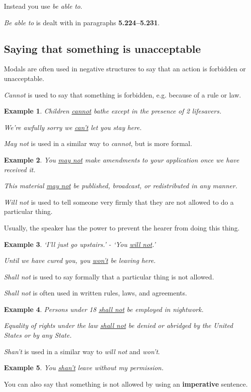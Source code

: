 \documentclass[oneside]{book}
\numberwithin{equation}{section}
\newtheorem{example}{Example}[section]
\begin{document}
Instead you use \textit{be able to}.

%
\textit{Be able to} is dealt with in paragraphs \textbf{5.224--5.231}.

\subsection{Saying that something is unacceptable}
\noindent{} Modals are often used in negative structures to say that an action is forbidden or unacceptable.

%
\noindent{} \textit{Cannot} is used to say that something is forbidden, e.g. because of a rule or law.
\begin{example}
    Children \underline{cannot} bathe except in the presence of 2 lifesavers.
    
    We're awfully sorry we \underline{can't} let you stay here.
\end{example}
%
\noindent{} \textit{May not} is used in a similar way to \textit{cannot}, but is more formal.
\begin{example}
    You \underline{may not} make amendments to your application once we have received it.
    
    This material \underline{may not} be published, broadcast, or redistributed in any manner.
\end{example}
%
\noindent{} \textit{Will not} is used to tell someone very firmly that they are not allowed to do a particular thing.

Usually, the speaker has the power to prevent the hearer from doing this thing.
\begin{example}
    `I'll just go upstairs.' - `You \underline{will not}.'
    
    Until we have cured you, you \underline{won't} be leaving here.
\end{example}
%
\noindent{} \textit{Shall not} is used to say formally that a particular thing is not allowed.

\textit{Shall not} is often used in written rules, laws, and agreements.
\begin{example}
    Persons under 18 \underline{shall not} be employed in nightwork.
    
    Equality of rights under the law \underline{shall not} be denied or abridged by the United States or by any State.
\end{example}
\textit{Shan't} is used in a similar way to \textit{will not} and \textit{won't}.
\begin{example}
    You \underline{shan't} leave without my permission.
\end{example}
%
\noindent{} You can also say that something is not allowed by using an \textbf{imperative} sentence.
\end{document}
